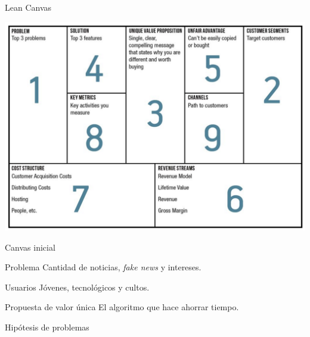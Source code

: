 \documentclass[12pt]{beamer}
\begin{document}
		\begin{frame}{Lean Canvas}
			\begin{center}
				\includegraphics[width=\textwidth,height=0.8\textheight,keepaspectratio]{img/canvas/canvas}
			\end{center}
		\end{frame}

		\begin{frame}{Canvas inicial}
			\begin{block}{Problema}
				Cantidad de noticias, \textit{fake news} y intereses.
			\end{block}
			\begin{block}{Usuarios}
				Jóvenes, tecnológicos y cultos.
			\end{block}
			\begin{block}{Propuesta de valor única}
				El algoritmo que hace ahorrar tiempo.
			\end{block}
		\end{frame}

		\begin{frame}{Hipótesis de problemas}

			\begin{center}
			\end{center}
        \end{frame}
\end{document}
